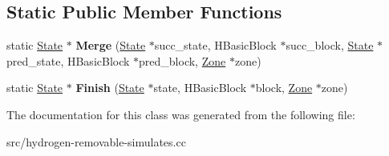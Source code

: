 \subsection*{Static Public Member Functions}
\begin{DoxyCompactItemize}
\item 
\hypertarget{classv8_1_1internal_1_1_state_afe7a1d9946a12238558552959d5110b8}{}static \hyperlink{classv8_1_1internal_1_1_state}{State} $\ast$ {\bfseries Merge} (\hyperlink{classv8_1_1internal_1_1_state}{State} $\ast$succ\+\_\+state, H\+Basic\+Block $\ast$succ\+\_\+block, \hyperlink{classv8_1_1internal_1_1_state}{State} $\ast$pred\+\_\+state, H\+Basic\+Block $\ast$pred\+\_\+block, \hyperlink{classv8_1_1internal_1_1_zone}{Zone} $\ast$zone)\label{classv8_1_1internal_1_1_state_afe7a1d9946a12238558552959d5110b8}

\item 
\hypertarget{classv8_1_1internal_1_1_state_a460c4dcf4815d3973c42e9f8005c93d7}{}static \hyperlink{classv8_1_1internal_1_1_state}{State} $\ast$ {\bfseries Finish} (\hyperlink{classv8_1_1internal_1_1_state}{State} $\ast$state, H\+Basic\+Block $\ast$block, \hyperlink{classv8_1_1internal_1_1_zone}{Zone} $\ast$zone)\label{classv8_1_1internal_1_1_state_a460c4dcf4815d3973c42e9f8005c93d7}

\end{DoxyCompactItemize}


The documentation for this class was generated from the following file\+:\begin{DoxyCompactItemize}
\item 
src/hydrogen-\/removable-\/simulates.\+cc\end{DoxyCompactItemize}
